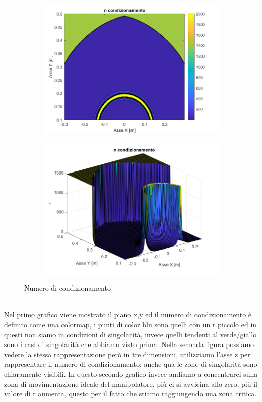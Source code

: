 \begin{figure}[!ht]
	\begin{subfigure}{.55\textwidth}
		\centering
		\includegraphics[width=.9\linewidth]{Immagini/Singolarity/Ncond}
		\label{fig:ncond}
	\end{subfigure}
	\begin{subfigure}{.55\textwidth}
		\centering
		\includegraphics[width=.9\linewidth]{Immagini/Singolarity/Ncond_surf}  
		\label{fig:nconds}
	\end{subfigure}
	\caption{Numero di condizionamento}
	\label{NumCondiz}
\end{figure}
\\Nel primo grafico viene mostrato il piano x,y ed il numero di condizionamento è definito come una colormap, i punti di color blu sono quelli con un r piccolo ed in questi non siamo in condizioni di singolarità, invece quelli tendenti al verde/giallo sono i casi di singolarità che abbiamo visto prima. Nella seconda figura possiamo vedere la stessa rappresentazione però in tre dimensioni, utilizziamo l'asse z per rappresentare il numero di condizionamento; anche qua le zone di singolarità sono chiaramente visibili.
In questo secondo grafico invece andiamo a concentrarci sulla zona di movimentazione ideale del manipolatore, più ci si avvicina allo zero, più il valore di r aumenta, questo per il fatto che stiamo raggiungendo una zona critica.
